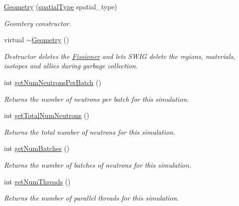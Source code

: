 \begin{DoxyCompactItemize}
\item 
\hyperlink{classGeometry_ad2146d68260c035d7236de7638c036de}{Geometry} (\hyperlink{Geometry_8h_af321382c4a8d9fdb71c83382f82fac00}{spatial\-Type} spatial\-\_\-type)
\begin{DoxyCompactList}\small\item\em Geomtery constructor. \end{DoxyCompactList}\item 
\hypertarget{classGeometry_ad55e832122ab3a2833dcaa6507867678}{virtual \hyperlink{classGeometry_ad55e832122ab3a2833dcaa6507867678}{$\sim$\-Geometry} ()}\label{classGeometry_ad55e832122ab3a2833dcaa6507867678}

\begin{DoxyCompactList}\small\item\em Destructor deletes the \hyperlink{classFissioner}{Fissioner} and lets S\-W\-I\-G delete the regions, materials, isotopes and allies during garbage collection. \end{DoxyCompactList}\item 
int \hyperlink{classGeometry_add8ce27223fdd5f038cbbaa4f552a2c1}{get\-Num\-Neutrons\-Per\-Batch} ()
\begin{DoxyCompactList}\small\item\em Returns the number of neutrons per batch for this simulation. \end{DoxyCompactList}\item 
int \hyperlink{classGeometry_a1110957b5b8e1eafdd6f34ffa233d4d1}{get\-Total\-Num\-Neutrons} ()
\begin{DoxyCompactList}\small\item\em Returns the total number of neutrons for this simulation. \end{DoxyCompactList}\item 
int \hyperlink{classGeometry_af45e47614fc0b25fffd16528d17b296c}{get\-Num\-Batches} ()
\begin{DoxyCompactList}\small\item\em Returns the number of batches of neutrons for this simulation. \end{DoxyCompactList}\item 
int \hyperlink{classGeometry_a254abef4b1f2a48e6b75001856e4c233}{get\-Num\-Threads} ()
\begin{DoxyCompactList}\small\item\em Returns the number of parallel threads for this simulation. \end{DoxyCompactList}\item 

\end{DoxyCompactItemize}
